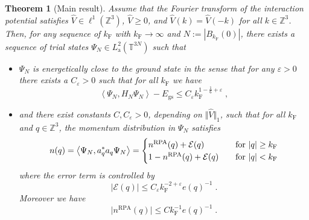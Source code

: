 \documentclass[12pt,a4paper]{article}
\numberwithin{equation}{section}
\newcommand{\cE}{\mathcal{E}}
\newcommand{\Zbb}{\mathbb{Z}}
\newcommand{\1}{\mathbb{I}}
\newcommand{\F}{\mathrm{F}}
\newcommand{\GS}{\mathrm{gs}}
\newcommand{\RPA}{\mathrm{RPA}}
\newcommand{\Z}{\mathbb{Z}}
\newcommand{\T}{\mathbb{T}}
\newcommand{\eva}[1]{\left\langle #1 \right\rangle}
\theoremstyle{plain}
\newtheorem{theorem}{Theorem}[section]
\theoremstyle{definition}
\theoremstyle{remark}
\theoremstyle{plain}
\theoremstyle{definition}
\theoremstyle{remark}
\begin{document}

\begin{theorem}[Main result] \label{thm:main}
Assume that the Fourier transform of the interaction potential satisfies $ \hat{V} \in \ell^1(\Z^3) $, $ \hat{V} \ge 0 $, and $ \hat{V}(k) = \hat{V}(-k) $ for all $k \in \Zbb^3$.
Then, for any sequence of $ k_{\F} $ with $ k_{\F} \to \infty $ and $ N := |B_{k_{\F}}(0)| $, there exists a sequence of trial states  $ \Psi_N \in L^2_{\mathrm{a}}(\T^{3N}) $ such that
\begin{itemize}
\item $ \Psi_N $ is energetically close to the ground state in the sense that for any $ \varepsilon > 0 $ there exists a $ C_\varepsilon > 0 $ such that for all $k_\F$ we have
\begin{equation} \label{eq:main1}
	\eva{\Psi_N, H_N \Psi_N} - E_{\GS}
	\le C_\varepsilon k_{\F}^{1-\frac 16 + \varepsilon} \;,
\end{equation}
\item and there exist constants $ C, C_\varepsilon > 0 $, depending on $ \Vert \hat{V} \Vert_1 $, such that for all $ k_{\F} $ and $ q \in \Z^3 $, the momentum distribution in $ \Psi_N $ satisfies
\begin{equation} \label{eq:main2}
	n(q) = \eva{\Psi_N, a_q^* a_q \Psi_N}
	= \begin{cases}
	n^{\RPA}(q) + \cE(q) & \quad
		\textnormal{for } |q| \ge k_{\F} \\
	1 - n^{\RPA}(q) + \cE(q) & \quad
		\textnormal{for } |q| < k_{\F} 
	\end{cases}
\end{equation}
where the error term is controlled by
\begin{equation}
	\lvert \cE(q)\rvert \le C_\varepsilon k_{\F}^{-2 +\varepsilon} e(q)^{-1} \;.
\end{equation}
Moreover we have 
\begin{equation}
\lvert n^{\RPA}(q)\rvert \le C k_{\F}^{-1} e(q)^{-1} \;.
\end{equation}
\end{itemize}
\end{theorem}
\end{document}
